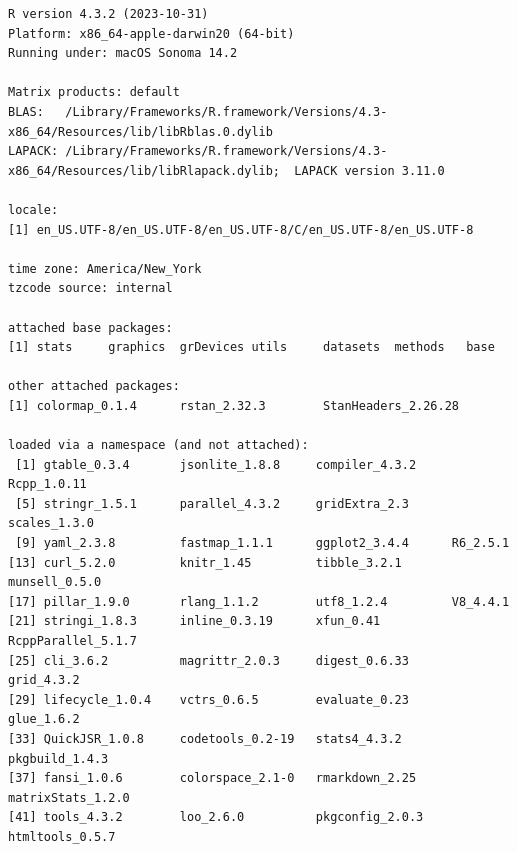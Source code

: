 \documentclass[
  letterpaper,
  DIV=11,
  numbers=noendperiod]{scrartcl}
\begin{document}
\begin{verbatim}
R version 4.3.2 (2023-10-31)
Platform: x86_64-apple-darwin20 (64-bit)
Running under: macOS Sonoma 14.2

Matrix products: default
BLAS:   /Library/Frameworks/R.framework/Versions/4.3-x86_64/Resources/lib/libRblas.0.dylib 
LAPACK: /Library/Frameworks/R.framework/Versions/4.3-x86_64/Resources/lib/libRlapack.dylib;  LAPACK version 3.11.0

locale:
[1] en_US.UTF-8/en_US.UTF-8/en_US.UTF-8/C/en_US.UTF-8/en_US.UTF-8

time zone: America/New_York
tzcode source: internal

attached base packages:
[1] stats     graphics  grDevices utils     datasets  methods   base     

other attached packages:
[1] colormap_0.1.4      rstan_2.32.3        StanHeaders_2.26.28

loaded via a namespace (and not attached):
 [1] gtable_0.3.4       jsonlite_1.8.8     compiler_4.3.2     Rcpp_1.0.11       
 [5] stringr_1.5.1      parallel_4.3.2     gridExtra_2.3      scales_1.3.0      
 [9] yaml_2.3.8         fastmap_1.1.1      ggplot2_3.4.4      R6_2.5.1          
[13] curl_5.2.0         knitr_1.45         tibble_3.2.1       munsell_0.5.0     
[17] pillar_1.9.0       rlang_1.1.2        utf8_1.2.4         V8_4.4.1          
[21] stringi_1.8.3      inline_0.3.19      xfun_0.41          RcppParallel_5.1.7
[25] cli_3.6.2          magrittr_2.0.3     digest_0.6.33      grid_4.3.2        
[29] lifecycle_1.0.4    vctrs_0.6.5        evaluate_0.23      glue_1.6.2        
[33] QuickJSR_1.0.8     codetools_0.2-19   stats4_4.3.2       pkgbuild_1.4.3    
[37] fansi_1.0.6        colorspace_2.1-0   rmarkdown_2.25     matrixStats_1.2.0 
[41] tools_4.3.2        loo_2.6.0          pkgconfig_2.0.3    htmltools_0.5.7   
\end{verbatim}
\end{document}
